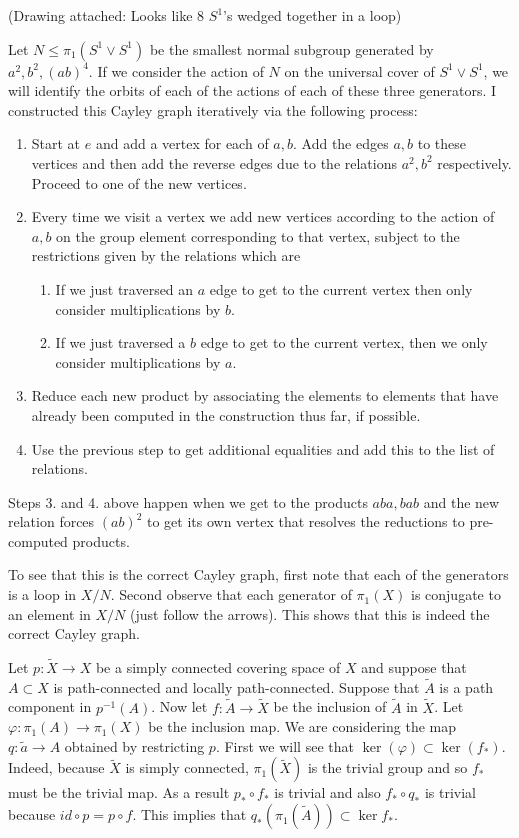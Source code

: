 \documentclass{article}
\newcommand{\exercise}[1]{\noindent{\textbf{Exercise #1:}}}
\begin{document}
\exercise{1.3.12} (Drawing attached: Looks like 8 $S^1$'s wedged
together in a loop)

Let $N \leq \pi_1(S^1 \vee S^1)$ be the smallest normal subgroup
generated by $a^2,b^2,(ab)^4$. If we consider the action of $N$ on the
universal cover of $S^1 \vee S^1$, we will identify the orbits of each
of the actions of each of these three generators. I constructed this
Cayley graph iteratively via the following process:
\begin{enumerate}
\item Start at $e$ and add a vertex for each of $a,b$. Add the edges
  $a,b$ to these vertices and then add the reverse edges due to the
  relations $a^2,b^2$ respectively. Proceed to one of the new vertices.
\item Every time we visit a vertex we add new vertices according to
  the action of $a,b$ on the group element corresponding to that
  vertex, subject to the restrictions given by the relations which are
  \begin{enumerate}
  \item If we just traversed an $a$ edge to get to the current vertex then
    only consider multiplications by $b$.
  \item If we just traversed a $b$ edge to get to the current vertex,
    then we only consider multiplications by $a$.
  \end{enumerate}
\item Reduce each new product by associating the elements to elements
  that have already been computed in the construction thus far, if possible.
\item Use the previous step to get additional equalities and add this
  to the list of relations.
\end{enumerate}
Steps 3. and 4. above happen when we get to the products $aba,bab$ and
the new relation forces $(ab)^2$ to get its own vertex that resolves
the reductions to pre-computed products.

To see that this is the correct Cayley graph, first note that each of
the generators is a loop in $X/N$. Second observe that each generator
of $\pi_1(X)$ is conjugate to an element in $X/N$ (just follow the
arrows). This shows that this is indeed the correct Cayley graph.

\exercise{1.3.15}

Let $p:\tilde{X}\to X$ be a simply connected covering space of $X$ and
suppose that $A \subset X$ is path-connected and locally
path-connected. Suppose that $\tilde{A}$ is a path component in
$p^{-1}(A)$. Now let $f: \tilde{A} \to \tilde{X}$ be the inclusion of
$\tilde{A}$ in $\tilde{X}$. Let $\varphi: \pi_1(A) \to \pi_1(X)$ be
the inclusion map. We are considering the map $q: \tilde{a} \to A$
obtained by restricting $p$. First we will see that $\ker(\varphi)
\subset \ker(f_*)$. Indeed, because $\tilde{X}$ is simply connected,
$\pi_1(\tilde{X})$ is the trivial group and so $f_*$ must be the
trivial map. As a result $p_* \circ f_*$ is trivial and also $f_*
\circ q_*$ is trivial because $id \circ p = p \circ f$. This implies
that $q_*(\pi_1(\tilde{A}))\subset \ker f_*$.
\end{document}
